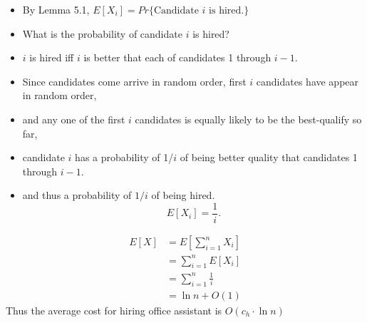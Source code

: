 \documentclass{beamer}
\begin{document}
\begin{frame}{}

\begin{itemize}
\item By Lemma 5.1, $E[X_i] = Pr\{ \mbox{Candidate $i$ is hired.} \}$
\item What is the probability of candidate $i$ is hired? 
\item $i$ is hired iff $i$ is better that each of candidates 1 through $i-1$. 
\item Since candidates come arrive in random order, first $i$ candidates have appear in random order,
\item and  any one of the first $i$ candidates is equally likely to be the best-qualify so far,
\item candidate $i$ has a probability of 1/$i$ of being better quality that candidates 1 through $i-1$. 
\item and thus a probability of $1/i$ of being hired. $$E[X_i] = \frac{1}{i}.$$
\end{itemize}
\end{frame}

\begin{frame}{}

\begin{align*}
E[X] &= E\left [\sum_{i=1}^nX_i\right ] \\
 &=\sum_{i=1}^nE\left [X_i\right ] \\
 &=\sum_{i=1}^n\frac{1}{i} \\
 &= \ln n +O(1)
\end{align*}
Thus the average cost for hiring office assistant is $O(c_h\cdot \ln n)$
\end{frame}
\end{document}
